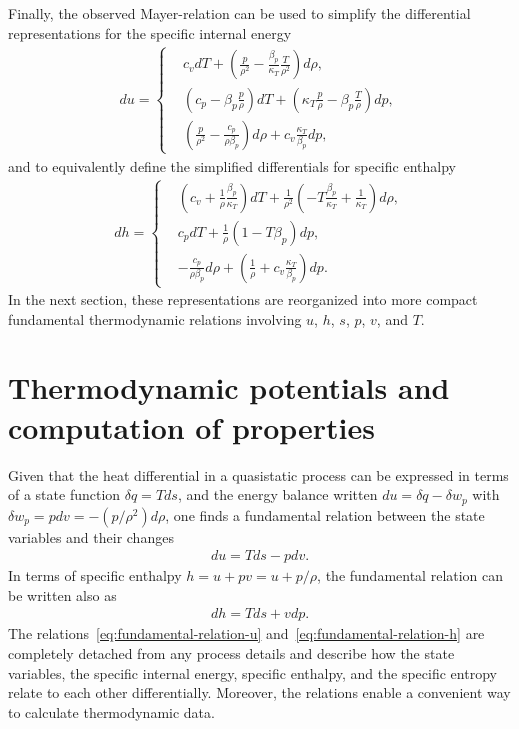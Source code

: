Finally, the observed Mayer-relation can be used to simplify the differential representations for the specific internal energy 
\begin{align}\label{eq:du-representations}
    du=\left\{\begin{aligned}&c_vdT+\left(\frac{p}{\rho^2}-\frac{\beta_p}{\kappa_T}\frac{T}{\rho^2}\right)d\rho,\\
    &\left(c_p-\beta_p\frac{p}{\rho}\right)dT+\left(\kappa_T\frac{p}{\rho}-\beta_p\frac{T}{\rho}\right)dp,\\
    &\left(\frac{p}{\rho^2}-\frac{c_p}{\rho\beta_p}\right)d\rho+c_v\frac{\kappa_T}{\beta_p}dp,\end{aligned}\right.
\end{align}
and to equivalently define the simplified differentials for specific enthalpy
\begin{align}
    dh=\left\{\begin{aligned}&\left(c_v+\frac{1}{\rho}\frac{\beta_p}{\kappa_T}\right)dT+\frac{1}{\rho^2}\left(-T\frac{\beta_p}{\kappa_T}+\frac{1}{\kappa_T}\right)d\rho,\\
    &c_pdT+\frac{1}{\rho}\left(1-T\beta_p\right)dp,\\
    &-\frac{c_p}{\rho\beta_p}d\rho+\left(\frac{1}{\rho}+c_v\frac{\kappa_T}{\beta_p}\right)dp.\end{aligned}\right.
\end{align}
In the next section, these representations are reorganized into more compact
fundamental thermodynamic relations involving $u$, $h$, $s$, $p$, $v$, and $T$.


\section{Thermodynamic potentials and computation of properties}
Given that the heat differential in a quasistatic process can be expressed in terms of a state function $\delta q=Tds$, and the energy balance written $du=\delta q-\delta w_p$ with $\delta w_p=pdv=-(p/\rho^2)d\rho$, one finds a fundamental relation between the state variables and their changes
\begin{align}\label{eq:fundamental-relation-u}
    du=Tds-pdv.
\end{align}
In terms of specific enthalpy $h=u+pv=u+p/\rho$, the fundamental relation can be written also as
\begin{align}\label{eq:fundamental-relation-h}
    dh=Tds+vdp.
\end{align}
The relations~\eqref{eq:fundamental-relation-u} and~\eqref{eq:fundamental-relation-h} are completely detached from any process details and describe how the state variables, the specific internal energy, specific enthalpy, and the specific entropy relate to each other differentially. 
Moreover, the relations enable a convenient way to calculate thermodynamic data. 

